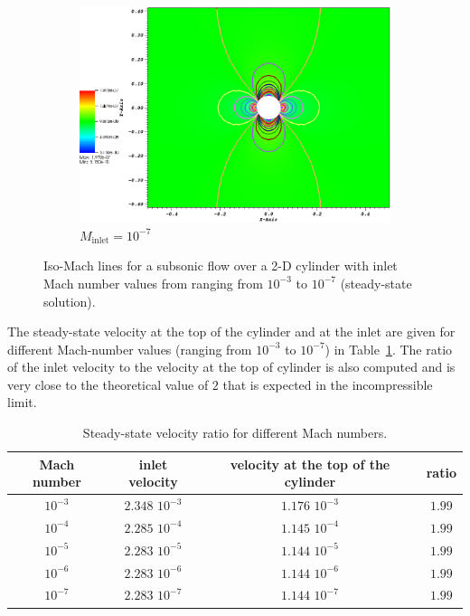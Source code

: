 \documentclass[review,10pt]{elsarticle}
\newcommand{\tbl}[1]{Table~\ref{#1}}                     %
\begin{document}
\begin{figure}[H]
        \begin{subfigure}[b]{0.495\textwidth}
                \centering
                \includegraphics[width=\textwidth]{figures/CylinderMach1em7ZoomIn.png}
                \caption{$M_{\text{inlet}}=10^{-7}$}
                \label{fig:cyl_1em7}
        \end{subfigure}
        \caption{Iso-Mach lines for a subsonic flow over a 2-D cylinder with inlet Mach number values 
				from ranging from $10^{-3}$ to $10^{-7}$ (steady-state solution).}
				\label{fig:cylinder}
\end{figure}
%
The steady-state velocity at the top of the cylinder and at the inlet are given for different Mach-number values 
(ranging from $10^{-3}$ to $10^{-7}$) in \tbl{tbl:velocity_ratio}. The ratio of the inlet velocity to 
the velocity at the top of cylinder is also computed and is very close to the theoretical value of $2$ 
that is expected in the incompressible limit.
%
\begin{table}[H]
\begin{center}
 \caption{\label{tbl:velocity_ratio}Steady-state velocity ratio for different Mach numbers.}
\begin{tabular}{|c|c|c|c|}
\hline
Mach number & inlet velocity & velocity at the top of the cylinder & ratio \\ \hline
$10^{-3}$ & $2.348$ $10^{-3}$ & $1.176$ $10^{-3}$& $1.99$  \\ \hline
$10^{-4}$ & $2.285$ $10^{-4}$ & $1.145$ $10^{-4}$& $1.99$  \\ \hline
$10^{-5}$ & $2.283$ $10^{-5}$ & $1.144$ $10^{-5}$ & $1.99$ \\ \hline
$10^{-6}$ & $2.283$ $10^{-6}$ & $1.144$ $10^{-6}$ & $1.99$ \\ \hline
$10^{-7}$ & $2.283$ $10^{-7}$ & $1.144$ $10^{-7}$ & $1.99$ \\ \hline 
\end{tabular}
\end{center}
\nonumber
\end{table}
\end{document}
